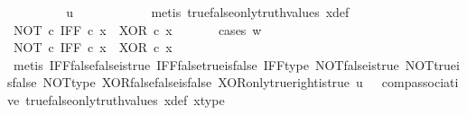 \begin{isabellebody}
\ \ \ \ \ \ \isamarkupfalse%
\ \isamarkupfalse%
\ {\isachardoublequoteopen}u\ {\isacharequal}{\kern0pt}\ {\isasymf}{\isachardoublequoteclose}\isanewline
\ \ \ \ \ \ \ \ \isamarkupfalse%
\ {\isacharparenleft}{\kern0pt}metis\ true{\isacharunderscore}{\kern0pt}false{\isacharunderscore}{\kern0pt}only{\isacharunderscore}{\kern0pt}truth{\isacharunderscore}{\kern0pt}values\ x{\isacharunderscore}{\kern0pt}def{\isacharparenright}{\kern0pt}\isanewline
\ \ \ \ \ \ \isamarkupfalse%
\ {\isachardoublequoteopen}{\isacharparenleft}{\kern0pt}NOT\ {\isasymcirc}\isactrlsub c\ IFF{\isacharparenright}{\kern0pt}\ {\isasymcirc}\isactrlsub c\ x\ {\isacharequal}{\kern0pt}\ XOR\ {\isasymcirc}\isactrlsub c\ x{\isachardoublequoteclose}\isanewline
\ \ \ \ \ \ \isamarkupfalse%
{\isacharparenleft}{\kern0pt}cases\ {\isachardoublequoteopen}w\ {\isacharequal}{\kern0pt}\ {\isasymt}{\isachardoublequoteclose}{\isacharparenright}{\kern0pt}\isanewline
\ \ \ \ \ \ \ \ \isamarkupfalse%
\ {\isachardoublequoteopen}{\isacharparenleft}{\kern0pt}NOT\ {\isasymcirc}\isactrlsub c\ IFF{\isacharparenright}{\kern0pt}\ {\isasymcirc}\isactrlsub c\ x\ {\isacharequal}{\kern0pt}\ XOR\ {\isasymcirc}\isactrlsub c\ x{\isachardoublequoteclose}\isanewline
\ \ \ \ \ \ \ \ \ \ \isamarkupfalse%
\ {\isacharparenleft}{\kern0pt}metis\ IFF{\isacharunderscore}{\kern0pt}false{\isacharunderscore}{\kern0pt}false{\isacharunderscore}{\kern0pt}is{\isacharunderscore}{\kern0pt}true\ IFF{\isacharunderscore}{\kern0pt}false{\isacharunderscore}{\kern0pt}true{\isacharunderscore}{\kern0pt}is{\isacharunderscore}{\kern0pt}false\ IFF{\isacharunderscore}{\kern0pt}type\ NOT{\isacharunderscore}{\kern0pt}false{\isacharunderscore}{\kern0pt}is{\isacharunderscore}{\kern0pt}true\ NOT{\isacharunderscore}{\kern0pt}true{\isacharunderscore}{\kern0pt}is{\isacharunderscore}{\kern0pt}false\ NOT{\isacharunderscore}{\kern0pt}type\ XOR{\isacharunderscore}{\kern0pt}false{\isacharunderscore}{\kern0pt}false{\isacharunderscore}{\kern0pt}is{\isacharunderscore}{\kern0pt}false\ XOR{\isacharunderscore}{\kern0pt}only{\isacharunderscore}{\kern0pt}true{\isacharunderscore}{\kern0pt}right{\isacharunderscore}{\kern0pt}is{\isacharunderscore}{\kern0pt}true\ {\isacartoucheopen}u\ {\isacharequal}{\kern0pt}\ {\isasymf}{\isacartoucheclose}\ comp{\isacharunderscore}{\kern0pt}associative{}\ true{\isacharunderscore}{\kern0pt}false{\isacharunderscore}{\kern0pt}only{\isacharunderscore}{\kern0pt}truth{\isacharunderscore}{\kern0pt}values\ x{\isacharunderscore}{\kern0pt}def\ x{\isacharunderscore}{\kern0pt}type{\isacharparenright}{\kern0pt}\isanewline

\end{isabellebody}
